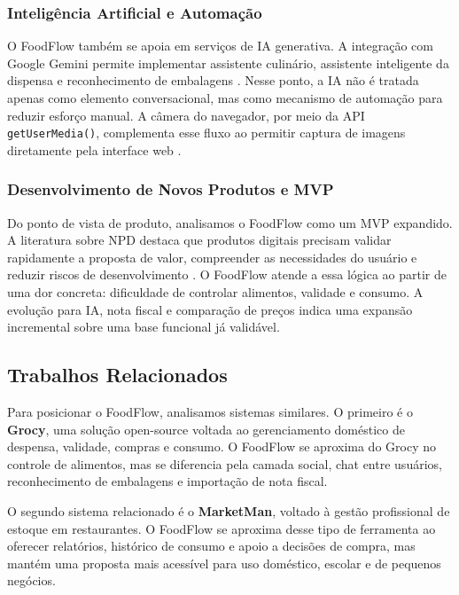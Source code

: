 \documentclass[12pt]{article}
\begin{document}
\subsubsection{Inteligência Artificial e Automação}

O FoodFlow também se apoia em serviços de IA generativa. A integração com Google Gemini permite implementar assistente culinário, assistente inteligente da dispensa e reconhecimento de embalagens \cite{gemini}. Nesse ponto, a IA não é tratada apenas como elemento conversacional, mas como mecanismo de automação para reduzir esforço manual. A câmera do navegador, por meio da API \texttt{getUserMedia()}, complementa esse fluxo ao permitir captura de imagens diretamente pela interface web \cite{mdn}.

\subsubsection{Desenvolvimento de Novos Produtos e MVP}

Do ponto de vista de produto, analisamos o FoodFlow como um MVP expandido. A literatura sobre NPD destaca que produtos digitais precisam validar rapidamente a proposta de valor, compreender as necessidades do usuário e reduzir riscos de desenvolvimento \cite{falahat2024}. O FoodFlow atende a essa lógica ao partir de uma dor concreta: dificuldade de controlar alimentos, validade e consumo. A evolução para IA, nota fiscal e comparação de preços indica uma expansão incremental sobre uma base funcional já validável.

\subsection{Trabalhos Relacionados}

Para posicionar o FoodFlow, analisamos sistemas similares. O primeiro é o \textbf{Grocy}, uma solução open-source voltada ao gerenciamento doméstico de despensa, validade, compras e consumo. O FoodFlow se aproxima do Grocy no controle de alimentos, mas se diferencia pela camada social, chat entre usuários, reconhecimento de embalagens e importação de nota fiscal.

O segundo sistema relacionado é o \textbf{MarketMan}, voltado à gestão profissional de estoque em restaurantes. O FoodFlow se aproxima desse tipo de ferramenta ao oferecer relatórios, histórico de consumo e apoio a decisões de compra, mas mantém uma proposta mais acessível para uso doméstico, escolar e de pequenos negócios.
\end{document}
